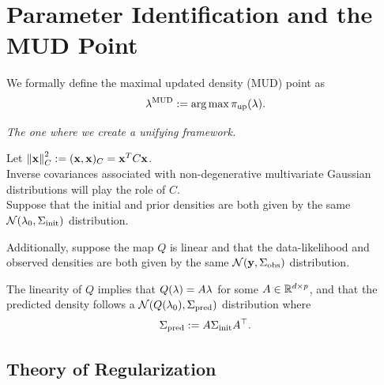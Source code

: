 \section{Parameter Identification and the MUD Point}

\begin{frame}

\centering
We formally define the maximal updated density (MUD) point as
\begin{equation}\label{eq:mudpt_inital_defn}
	\lambda^{\text{MUD}} := \operatorname*{arg\,max} {\operatorname*{\pi_{up}}}(\lambda).
\end{equation}

\end{frame}

\begin{frame}[t]{\it The one where we create a unifying framework.}

Let $\left\Vert\mathbf{x}\right\Vert_C^2 := (\mathbf{x}, \mathbf{x})_C = \mathbf{x}^T C \mathbf{x}$. \\

Inverse covariances associated with non-degenerative multivariate Gaussian distributions will play the role of $C$. \\

Suppose that the initial and prior densities are both given by the same $\mathcal{N}(\lambda_0, \Sigma_\text{init})$ distribution.

\bigskip
Additionally, suppose the map $Q$ is linear and that the data-likelihood and observed densities are both given by the same $\mathcal{N}(\mathbf{y}, \Sigma_\text{obs})$ distribution.

\bigskip
The linearity of $Q$ implies that $Q(\lambda)=A\lambda$ for some $A\in\mathbb{R}^{d\times p}$, and that the predicted density follows a $\mathcal{N}(Q(\lambda_0), \Sigma_\text{pred})$ distribution where
\begin{equation}\label{eq:predictCov}
	\Sigma_\text{pred} := A\Sigma_\text{init} A^\top.
\end{equation}

\end{frame}

\subsection{Theory of Regularization}

